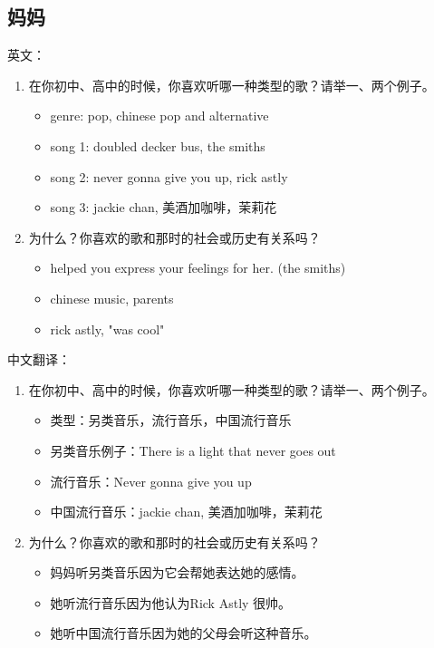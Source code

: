 \documentclass[11pt]{article}
\begin{document}
\subsection{妈妈}
\label{sec:org2eb8b00}
英文：
\begin{enumerate}
\item 在你初中、高中的时候，你喜欢听哪一种类型的歌？请举一、两个例子。
\begin{itemize}
\item genre: pop, chinese pop and alternative
\item song 1: doubled decker bus, the smiths
\item song 2: never gonna give you up, rick astly
\item song 3: jackie chan, 美酒加咖啡，茉莉花
\end{itemize}
\item 为什么？你喜欢的歌和那时的社会或历史有关系吗？
\begin{itemize}
\item helped you express your feelings for her. (the smiths)
\item chinese music, parents
\item rick astly, "was cool"
\end{itemize}
\end{enumerate}
中文翻译：
\begin{enumerate}
\item 在你初中、高中的时候，你喜欢听哪一种类型的歌？请举一、两个例子。
\begin{itemize}
\item 类型：另类音乐，流行音乐，中国流行音乐
\item 另类音乐例子：There is a light that never goes out
\item 流行音乐：Never gonna give you up
\item 中国流行音乐：jackie chan, 美酒加咖啡，茉莉花
\end{itemize}
\item 为什么？你喜欢的歌和那时的社会或历史有关系吗？
\begin{itemize}
\item 妈妈听另类音乐因为它会帮她表达她的感情。
\item 她听流行音乐因为他认为Rick Astly 很帅。
\item 她听中国流行音乐因为她的父母会听这种音乐。
\end{itemize}
\end{enumerate}
\end{document}
